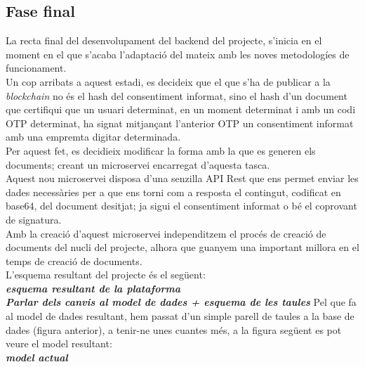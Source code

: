 \subsection{Fase final}
La recta final del desenvolupament del backend del projecte, s'inicia en el moment en el que s'acaba l'adaptació del mateix amb les noves metodologíes de funcionament.\\ 
Un cop arribats a aquest estadi, es decideix que el que s'ha de publicar a la \textit{blockchain} no és el hash del consentiment informat, sino el hash d'un document que certifiqui que un usuari determinat, en un moment determinat i amb un codi OTP determinat, ha signat mitjançant l'anterior OTP un consentiment informat amb una empremta digitar determinada.\\
Per aquest fet, es decidieix modificar la forma amb la que es generen els documents; creant un microservei encarregat d'aquesta tasca.\\
Aquest nou microservei disposa d'una senzilla API Rest que ens permet enviar les dades necessàries per a que ens torni com a resposta el contingut, codificat en base64, del document desitjat; ja sigui el consentiment informat o bé el coprovant de signatura.\\
Amb la creació d'aquest microservei independitzem el procés de creació de documents del nucli del projecte, alhora que guanyem una important millora en el temps de creació de documents.\\
\newline L'esquema resultant del projecte és el següent:\\
\newline \textit{\textbf{esquema resultant de la plataforma}}\\
\newline \textit{\textbf{Parlar dels canvis al model de dades + esquema de les taules}}
Pel que fa al model de dades resultant, hem passat d'un simple parell de taules a la base de dades (figura anterior), a tenir-ne unes cuantes més, a la figura següent es pot veure el model resultant:\\
\newline \textbf{\textit{model actual}}
